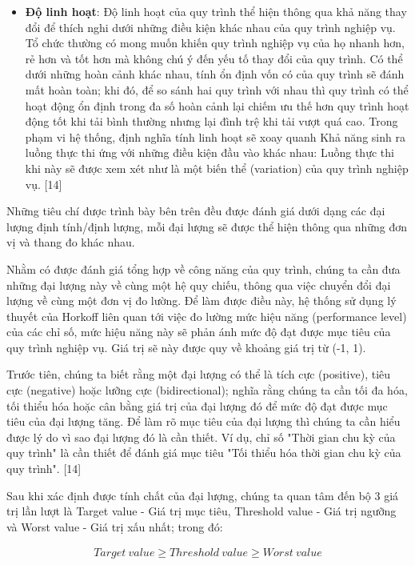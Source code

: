 \begin{itemize}
      \item \textbf{Độ linh hoạt}: Độ linh hoạt của quy trình thể hiện thông qua khả năng thay đổi để thích nghi dưới những điều kiện khác nhau của quy trình nghiệp vụ. Tổ chức thường có mong muốn khiến quy trình nghiệp vụ của họ nhanh hơn, rẻ hơn và tốt hơn mà không chú ý đến yếu tố thay đổi của quy trình. Có thể dưới những hoàn cảnh khác nhau, tính ổn định vốn có của quy trình sẽ đánh mất hoàn toàn; khi đó, để so sánh hai quy trình với nhau thì quy trình có thể hoạt động ổn định trong đa số hoàn cảnh lại chiếm ưu thế hơn quy trình hoạt động tốt khi tải bình thường nhưng lại đình trệ khi tải vượt quá cao. Trong phạm vi hệ thống, định nghĩa tính linh hoạt sẽ xoay quanh Khả năng sinh ra luồng thực thi ứng với những điều kiện đầu vào khác nhau: Luồng thực thi khi này sẽ được xem xét như là một biến thể (variation) của quy trình nghiệp vụ. [14]
\end{itemize}

Những tiêu chí được trình bày bên trên đều được đánh giá dưới dạng các đại lượng định tính/định lượng, mỗi đại lượng sẽ được thể hiện thông qua những đơn vị và thang đo khác nhau.

Nhằm có được đánh giá tổng hợp về công năng của quy trình, chúng ta cần đưa những đại lượng này về cùng một hệ quy chiếu, thông qua việc chuyển đổi đại lượng về cùng một đơn vị đo lường. Để làm được điều này, hệ thống sử dụng lý thuyết của Horkoff liên quan tới việc đo lường mức hiệu năng (performance level) của các chỉ số, mức hiệu năng này sẽ phản ánh mức độ đạt được mục tiêu của quy trình nghiệp vụ. Giá trị sẽ này được quy về khoảng giá trị từ (-1, 1).

Trước tiên, chúng ta biết rằng một đại lượng có thể là tích cực (positive), tiêu cực (negative) hoặc lưỡng cực (bidirectional); nghĩa rằng chúng ta cần tối đa hóa, tối thiểu hóa hoặc cân bằng giá trị của đại lượng đó để mức độ đạt được mục tiêu của đại lượng tăng. Để làm rõ mục tiêu của đại lượng thì chúng ta cần hiểu được lý do vì sao đại lượng đó là cần thiết. Ví dụ, chỉ số "Thời gian chu kỳ của quy trình" là cần thiết để đánh giá mục tiêu "Tối thiểu hóa thời gian chu kỳ của quy trình". [14]

Sau khi xác định được tính chất của đại lượng, chúng ta quan tâm đến bộ 3 giá trị lần lượt là Target value - Giá trị mục tiêu, Threshold value - Giá trị ngưỡng và Worst value - Giá trị xấu nhất; trong đó:

\begin{align}
      Target{\ }value \geq Threshold{\ }value \geq Worst{\ }value
\end{align}

